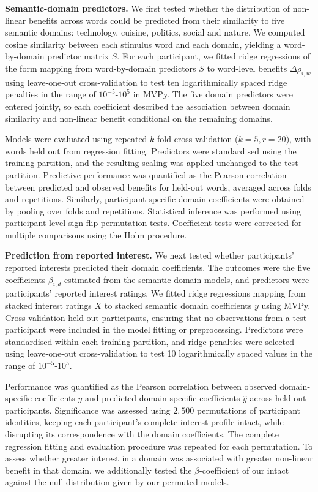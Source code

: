 \documentclass[pdflatex,sn-mathphys]{sn-jnl}
\begin{document}
\textbf{Semantic-domain predictors.} We first tested whether the distribution of non-linear benefits across words could be predicted from their similarity to five semantic domains: technology, cuisine, politics, social and nature. We computed cosine similarity between each stimulus word and each domain, yielding a word-by-domain predictor matrix $S$. For each participant, we fitted ridge regressions of the form mapping from word-by-domain predictors $S$ to word-level benefits $\Delta\rho_{i,w}$ using leave-one-out cross-validation to test ten logarithmically spaced ridge penalties in the range of $10^{-5}$-$10^{5}$ in MVPy\cite{mvpy}. The five domain predictors were entered jointly, so each coefficient described the association between domain similarity and non-linear benefit conditional on the remaining domains.

Models were evaluated using repeated $k$-fold cross-validation ($k = 5, r = 20$), with words held out from regression fitting. Predictors were standardised using the training partition, and the resulting scaling was applied unchanged to the test partition. Predictive performance was quantified as the Pearson correlation between predicted and observed benefits for held-out words, averaged across folds and repetitions. Similarly, participant-specific domain coefficients were obtained by pooling over folds and repetitions. Statistical inference was performed using participant-level sign-flip permutation tests. Coefficient tests were corrected for multiple comparisons using the Holm procedure.

\textbf{Prediction from reported interest.} We next tested whether participants' reported interests predicted their domain coefficients. The outcomes were the five coefficients $\beta_{i,d}$ estimated from the semantic-domain models, and predictors were participants' reported interest ratings. We fitted ridge regressions mapping from stacked interest ratings $X$ to stacked semantic domain coefficients $y$ using MVPy\cite{mvpy}. Cross-validation held out participants, ensuring that no observations from a test participant were included in the model fitting or preprocessing. Predictors were standardised within each training partition, and ridge penalties were selected using leave-one-out cross-validation to test 10 logarithmically spaced values in the range of $10^{-5}$-$10^{5}$. 

Performance was quantified as the Pearson correlation between observed domain-specific coefficients $y$ and predicted domain-specific coefficients $\hat{y}$ across held-out participants. Significance was assessed using $2,500$ permutations of participant identities, keeping each participant's complete interest profile intact, while disrupting its correspondence with the domain coefficients. The complete regression fitting and evaluation procedure was repeated for each permutation. To assess whether greater interest in a domain was associated with greater non-linear benefit in that domain, we additionally tested the $\beta$-coefficient of our intact against the null distribution given by our permuted models.
\end{document}
